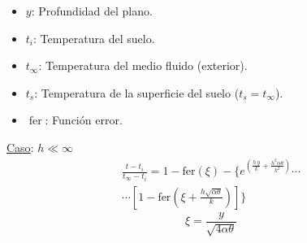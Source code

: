 \documentclass[letter,oneside,10pt]{article}
\DeclareMathOperator{\fer}{fer}
\begin{document}
\begin{multicols}{3}
\begin{itemize}
    \item $y$: Profundidad del plano.
    \item $t_i$: Temperatura del suelo.
    \item $t_\infty$: Temperatura del medio fluido (exterior).
    \item $t_s$: Temperatura de la superficie del suelo ($t_s = t_\infty$).
    \item $\fer$: Función error.
\end{itemize}
\scriptsize
\underline{Caso}: $h\ll\infty$
\begin{equation*}
    \begin{split}
        \frac{t-t_i}{t_\infty-t_i} = 
        1 -
        \text{fer}(\xi) -
        \Biggl\{
            e^{\left(
                \frac{h\,y}{k}+\frac{h^2\alpha\theta}{k^2}
            \right)}
        \cdots\\
        \cdots\left[
            1 - \text{fer}\left(
                \xi + \frac{h\sqrt{\alpha\theta}}{k}
            \right)
        \right]
        \Biggl\}
    \end{split}
\end{equation*}
\begin{equation*}
    \xi = \frac{y}{\sqrt{4\alpha\theta}}
\end{equation*}


\end{multicols}
\end{document}
